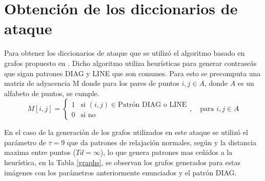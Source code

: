 \section{Obtenci\'on de los diccionarios de ataque}
Para obtener los diccionarios de ataque que se utiliz\'o el algoritmo basado en grafos propuesto en \cite{van2010purely}. Dicho algoritmo utiliza heur\'isticas para generar contrase\~as que sigan patrones DIAG y LINE \cite{s22051987} que son comunes. Para esto se precomputa una matriz de adyacencia M donde para los pares de puntos $i,j \in A$, donde $A$ es un alfabeto de puntos, se cumple.
\[
 M[i,j] = 
\begin{cases} 
	1 & \text{si } (i, j) \in \text{Patrón DIAG o LINE} \\
	0 & \text{si no}
\end{cases}
, \quad \text{para } i,j \in A
\] 

En el caso de la generaci\'on de los grafos utilizados en este ataque se utiliz\'o el par\'ametro de $\tau=9$ que da patrones de relajaci\'on normales, seg\'un \cite{van2010purely} y la distancia maxima entre puntos ($Td = \infty$), lo que genera patrones mas ce\~nidos a la heur\'istica, en la Tabla \ref{graphs},  se observan los grafos generados para estas im\'agenes con los par\'ametros anteriormente enunciados y el patr\'on DIAG.



